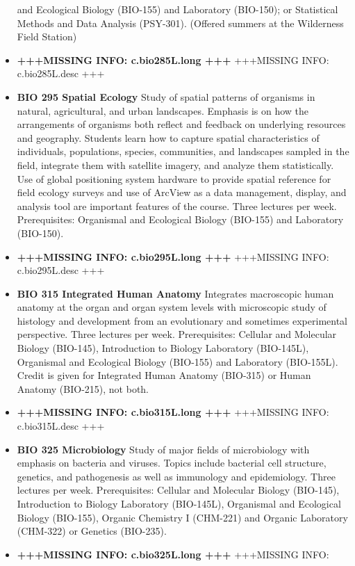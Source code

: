 \documentclass[
  letterpaper,
]{scrbook}
\begin{document}
\begin{itemize}
  and Ecological Biology (BIO-155) and Laboratory (BIO-150); or
  Statistical Methods and Data Analysis (PSY-301). (Offered summers at
  the Wilderness Field Station)
\item
  \textbf{+++MISSING INFO: c.bio285L.long +++} +++MISSING INFO:
  c.bio285L.desc +++
\item
  \textbf{BIO 295 Spatial Ecology} Study of spatial patterns of
  organisms in natural, agricultural, and urban landscapes. Emphasis is
  on how the arrangements of organisms both reflect and feedback on
  underlying resources and geography. Students learn how to capture
  spatial characteristics of individuals, populations, species,
  communities, and landscapes sampled in the field, integrate them with
  satellite imagery, and analyze them statistically. Use of global
  positioning system hardware to provide spatial reference for field
  ecology surveys and use of ArcView as a data management, display, and
  analysis tool are important features of the course. Three lectures per
  week. Prerequisites: Organismal and Ecological Biology (BIO-155) and
  Laboratory (BIO-150).
\item
  \textbf{+++MISSING INFO: c.bio295L.long +++} +++MISSING INFO:
  c.bio295L.desc +++
\item
  \textbf{BIO 315 Integrated Human Anatomy} Integrates macroscopic human
  anatomy at the organ and organ system levels with microscopic study of
  histology and development from an evolutionary and sometimes
  experimental perspective. Three lectures per week. Prerequisites:
  Cellular and Molecular Biology (BIO-145), Introduction to Biology
  Laboratory (BIO-145L), Organismal and Ecological Biology (BIO-155) and
  Laboratory (BIO-155L). Credit is given for Integrated Human Anatomy
  (BIO-315) or Human Anatomy (BIO-215), not both.
\item
  \textbf{+++MISSING INFO: c.bio315L.long +++} +++MISSING INFO:
  c.bio315L.desc +++
\item
  \textbf{BIO 325 Microbiology} Study of major fields of microbiology
  with emphasis on bacteria and viruses. Topics include bacterial cell
  structure, genetics, and pathogenesis as well as immunology and
  epidemiology. Three lectures per week. Prerequisites: Cellular and
  Molecular Biology (BIO-145), Introduction to Biology Laboratory
  (BIO-145L), Organismal and Ecological Biology (BIO-155), Organic
  Chemistry I (CHM-221) and Organic Laboratory (CHM-322) or Genetics
  (BIO-235).
\item
  \textbf{+++MISSING INFO: c.bio325L.long +++} +++MISSING INFO:

\end{itemize}
\end{document}
